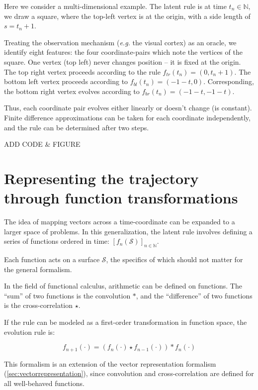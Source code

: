 \documentclass{article}
\begin{document}
Here we consider a multi-dimensional example.
The latent rule is at time $t_n \in \mathbb{N}$, we draw a square,
where the top-left vertex is at the origin,
with a side length of $s = t_n + 1$.

Treating the observation mechanism (\textit{e.g.} the visual cortex) as an oracle,
we identify eight features: the four coordinate-pairs which note the vertices of the square.
One vertex (top left) never changes position -- it is fixed at the origin.
The top right vertex proceeds according to the rule $f_{tr}(t_n) = (0, t_n + 1)$.
The bottom left vertex proceeds according to $f_{bl}(t_n) = (-1 - t, 0)$.
Corresponding, the bottom right vertex evolves according to $f_{br}(t_n) = (-1 -t, -1 -t)$.

Thus, each coordinate pair evolves either linearly or doesn't change (is constant).
Finite difference approximations can be taken for each coordinate independently,
and the rule can be determined after two steps.

ADD CODE \& FIGURE

\section{Representing the trajectory through function transformations}

The idea of mapping vectors across a time-coordinate can be expanded to a larger space of problems.
In this generalization, the latent rule involves defining a series of functions ordered in time:
$ \left[ f_n(\mathcal{S})\right]_{n \in \mathbb{N}}$.

Each function acts on a surface $\mathcal{S}$,
the specifics of which should not matter for the general formalism.

In the field of functional calculus, arithmetic can be defined on functions.
The ``sum'' of two functions is the convolution $*$, and the ``difference''
of two functions is the cross-correlation $\star$.

If the rule can be modeled as a first-order transformation in function space,
the evolution rule is:

\begin{equation}
  f_{n+1}(\cdot) = (f_n(\cdot) \star f_{n-1}(\cdot)) * f_n(\cdot)
\end{equation}

This formalism is an extension of the vector representation formalism (\ref{sec:vectorrepresentation}),
since convolution and cross-correlation are defined for all well-behaved functions.
\end{document}
